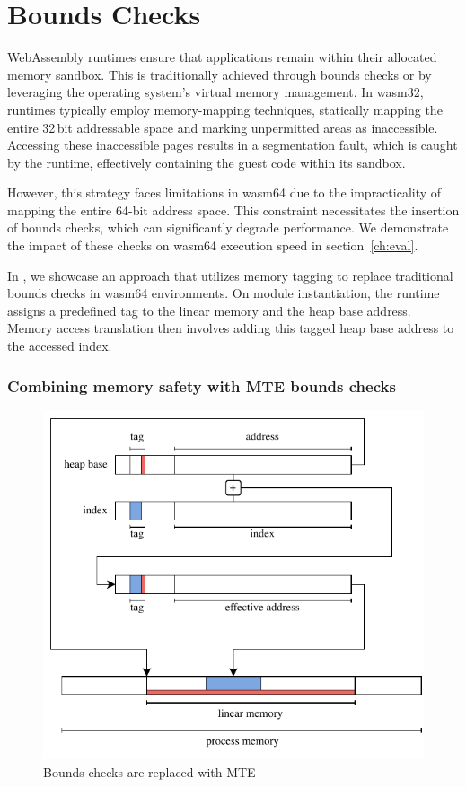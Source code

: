 \section{Bounds Checks}
\label{sec:bounds-checks}

WebAssembly runtimes ensure that applications remain within their allocated memory sandbox.
This is traditionally achieved through bounds checks or by leveraging the operating system's virtual memory management.
In wasm32, runtimes typically employ memory-mapping techniques, statically mapping the entire 32\,bit addressable space and marking unpermitted areas as inaccessible.
Accessing these inaccessible pages results in a segmentation fault, which is caught by the runtime, effectively containing the guest code within its sandbox.

However, this strategy faces limitations in wasm64 due to the impracticality of mapping the entire 64-bit address space.
This constraint necessitates the insertion of bounds checks, which can significantly degrade performance.
We demonstrate the impact of these checks on wasm64 execution speed in section~\ref{ch:eval}.

In , we showcase an approach that utilizes memory tagging to replace traditional bounds checks in wasm64 environments.
On module instantiation, the runtime assigns a predefined tag to the linear memory and the heap base address.
Memory access translation then involves adding this tagged heap base address to the accessed index.

\subsubsection{Combining memory safety with MTE bounds checks}

\begin{figure}[t]
    \centering
    \includegraphics[scale=0.75]{figures/build/bounds-mem-safety}
    \caption{Bounds checks are replaced with MTE}
    \label{fig:system-design-mem-safety-bounds}
\end{figure}

